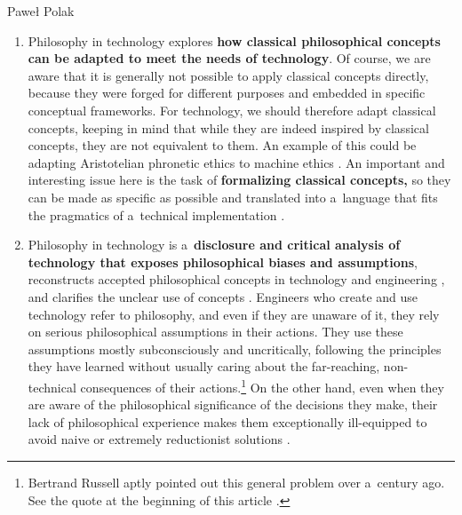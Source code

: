 \begin{artengenv}{Paweł Polak}
\begin{enumerate}[label=(\Roman*)]
\item Philosophy in technology explores \textbf{how classical philosophical concepts can be adapted to meet the needs of technology}. Of course, we are aware that it is generally not possible to apply classical concepts directly, because they were forged for different purposes and embedded in specific conceptual frameworks. For technology, we should therefore adapt classical concepts, keeping in mind that while they are indeed inspired by classical concepts, they are not equivalent to them. An example of this could be adapting Aristotelian phronetic ethics to machine ethics 
\parencites[][]{polak_phronetic_2020}[][]{polak_ethics_2020}. %
 An important and interesting issue here is the task of \textbf{formalizing classical concepts,} so they can be made as specific as possible and translated into a~language that fits the pragmatics of a~technical implementation 
\parencites[e.g][]{darowski_relacja_2006}[][]{tavani_ethics_2013}.%




\item Philosophy in technology is a~\textbf{disclosure and critical analysis of technology that exposes philosophical biases and assumptions}, reconstructs accepted philosophical concepts in technology and engineering 
\parencite[e.g][]{smith_promise_2019}, %
 and clarifies the unclear use of concepts 
\parencite[e.g][]{cervantes_artificial_2019}. %
 Engineers who create and use technology refer to philosophy, and even if they are unaware of it, they rely on serious philosophical assumptions in their actions. They use these assumptions mostly subconsciously and uncritically, following the principles they have learned without usually caring about the far-reaching, non-technical consequences of their actions.\footnote{Bertrand Russell aptly pointed out this general problem over a~century ago. See the quote at the beginning of this article 
\parencite[][pp.243–244]{russell_problems_1912}.%
} On the other hand, even when they are aware of the philosophical significance of the decisions they make, their lack of philosophical experience makes them exceptionally ill-equipped to avoid naive or extremely reductionist solutions 
\parencite[cf.][]{gordon_building_2020}.%





\end{enumerate}
\end{artengenv}

